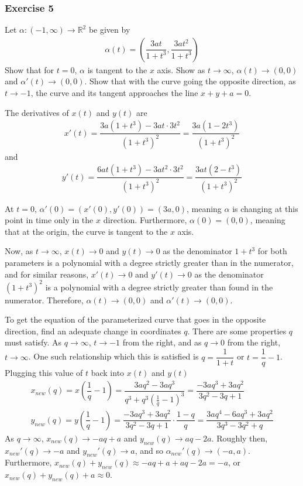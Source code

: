\documentclass{article}
\newcommand{\R}{\mathbb{R}}
\begin{document}
	\subsubsection*{Exercise 5}
	Let $\alpha \colon (-1, \infty) \to \R^2$ be given by
	\begin{gather*}
		\alpha(t) = \left( \dfrac{3at}{1 + t^3}, \dfrac{3at^2}{1 + t^3} \right)
	\end{gather*}
	Show that for $t = 0$, $\alpha$ is tangent to the $x$ axis. Show as $t \to \infty$, $\alpha(t) \to (0, 0)$ and $\alpha'(t) \to (0, 0)$. Show that with the curve going the opposite direction, as $t \to -1$, the curve and its tangent approaches the line $x + y + a = 0$.
	
	The derivatives of $x(t)$ and $y(t)$ are
	\begin{gather*}
		x'(t) = \dfrac{3a(1 + t^3) - 3at \cdot 3t^2}{(1 + t^3)^2} = \dfrac{3a(1 - 2t^3)}{(1 + t^3)^2}
	\end{gather*}
	and
	\begin{gather*}
		y'(t) = \dfrac{6at(1 + t^3) - 3at^2 \cdot 3t^2}{(1 + t^3)^2} = \dfrac{3at(2 - t^3)}{(1 + t^3)^2}
	\end{gather*}

	At $t = 0$, $\alpha'(0) = (x'(0), y'(0)) = (3a, 0)$, meaning $\alpha$ is changing at this point in time only in the $x$ direction. Furthermore, $\alpha(0) = (0, 0)$, meaning that at the origin, the curve is tangent to the $x$ axis.
	
	Now, as $t \to \infty$, $x(t) \to 0$ and $y(t) \to 0$ as the denominator $1 + t^3$ for both parameters is a polynomial with a degree strictly greater than in the numerator, and for similar reasons, $x'(t) \to 0$ and $y'(t) \to 0$ as the denominator $(1 + t^3)^2$ is a polynomial with a degree strictly greater than found in the numerator. Therefore, $\alpha(t) \to (0, 0)$ and $\alpha'(t) \to (0, 0)$.
	
	To get the equation of the parameterized curve that goes in the opposite direction, find an adequate change in coordinates $q$. There are some properties $q$ must satisfy. As $q \to \infty$, $t \to -1$ from the right, and as $q \to 0$ from the right, $t \to \infty$. One such relationship which this is satisfied is $q = \dfrac{1}{1 + t}$ or $t = \dfrac{1}{q} - 1$. Plugging this value of $t$ back into $x(t)$ and $y(t)$
	\begin{gather*}
		x_{new}(q) = x \left( \dfrac{1}{q} - 1 \right) = \dfrac{3aq^2 - 3aq^3}{q^3 + q^3(\frac{1}{q} - 1)^3} = \dfrac{-3aq^3 + 3aq^2}{3q^2 - 3q + 1} \\
		y_{new}(q) = y \left( \dfrac{1}{q} - 1 \right) = \dfrac{-3aq^3 + 3aq^2}{3q^2 - 3q + 1} \cdot \dfrac{1 - q}{q} = \dfrac{3aq^4 - 6aq^3 + 3aq^2}{3q^3 - 3q^2 + q} 
	\end{gather*}
	As $q \to \infty$, $x_{new}(q) \to -aq + a$ and $y_{new}(q) \to aq - 2a$. Roughly then, $x_{new}'(q) \to -a$ and $y_{new}'(q) \to a$, and so $\alpha_{new}'(q) \to (-a, a)$. Furthermore, $x_{new}(q) + y_{new}(q) \approx -aq + a + aq - 2a = -a$, or $x_{new}(q) + y_{new}(q) + a \approx 0$.
	
\end{document}
